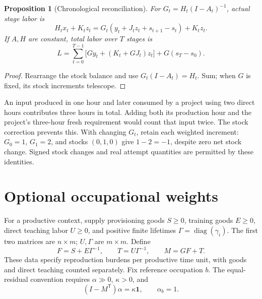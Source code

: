 \documentclass[11pt,a4paper]{article}
\newtheorem{proposition}[theorem]{Proposition}
\begin{document}
\begin{proposition}[Chronological reconciliation]
For $G_t=H_t(I-A_t)^{-1}$, actual stage labor is
\begin{equation}
H_tx_t+K_tz_t=G_t(y_t+J_tz_t+s_{t+1}-s_t)+K_tz_t.
\end{equation}
If $A,H$ are constant, total labor over $T$ stages is
\begin{equation}
L=\sum_{t=0}^{T-1}\bigl[Gy_t+(K_t+GJ_t)z_t\bigr]+G(s_T-s_0).
\end{equation}
\end{proposition}
\begin{proof}
Rearrange the stock balance and use $G_t(I-A_t)=H_t$. Sum; when $G$ is fixed, its stock increments telescope.
\end{proof}

An input produced in one hour and later consumed by a project using two direct hours contributes three hours in total. Adding both its production hour and the project's three-hour fresh requirement would count that input twice. The stock correction prevents this. With changing $G_t$, retain each weighted increment: $G_0=1$, $G_1=2$, and stocks $(0,1,0)$ give $1-2=-1$, despite zero net stock change. Signed stock changes and real attempt quantities are permitted by these identities.

\section{Optional occupational weights}
For a productive context, supply provisioning goods $S\geq0$, training goods $E\geq0$, direct teaching labor $U\geq0$, and positive finite lifetimes $\Gamma=\operatorname{diag}(\gamma_i)$. The first two matrices are $n\times m$; $U,\Gamma$ are $m\times m$. Define
\begin{equation}
F=S+E\Gamma^{-1},\qquad T=U\Gamma^{-1},\qquad M=GF+T.
\end{equation}
These data specify reproduction burdens per productive time unit, with goods and direct teaching counted separately. Fix reference occupation $b$. The equal-residual convention requires $\alpha\gg0$, $\kappa>0$, and
\begin{equation}
(I-M^{\mathsf T})\alpha=\kappa\mathbf1,\qquad\alpha_b=1.
\end{equation}
\end{document}
